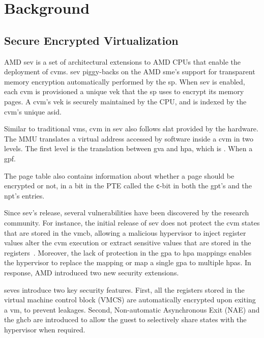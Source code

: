 \section{Background}
\subsection{Secure Encrypted Virtualization}

AMD \gls{sev} is a set of architectural extensions to AMD CPUs that enable the deployment of \glspl{cvm}.
\gls{sev} piggy-backs on the AMD \gls{sme}'s support for transparent memory encryption automatically performed by the \gls{sp}.
When \gls{sev} is enabled, each \gls{cvm} is provisioned a unique \gls{vek} that the \gls{sp} uses to encrypt its memory pages. A \gls{cvm}'s \gls{vek} is securely maintained by the CPU, and is indexed by the \gls{cvm}'s unique \gls{asid}.




Similar to traditional \glspl{vm}, \gls{cvm} in \gls{sev} also follows \gls{slat} provided by the hardware.
The MMU translates a virtual address accessed by software inside a \gls{cvm} in two levels. The first level is the translation between \gls{gva} and \gls{hpa}, which is . When a \gls{gpf}.

The page table also contains information about whether a page should be encrypted or not, in a bit in the PTE called the \texttt{c}-bit in both the \gls{gpt}'s and the \gls{npt}'s entries.



Since \gls{sev}'s release, several vulnerabilities have been discovered by the research community.
For instance, the initial release of \gls{sev} does not protect the \gls{cvm} states that are stored in the \gls{vmcb}, allowing a malicious hypervisor to inject register values alter the \gls{cvm} execution or extract sensitive values that are stored in the registers~\cite{morbitzer_extracting_2019}.
Moreover, the lack of protection in the \gls{gpa} to \gls{hpa} mappings enables the hypervisor to replace the mapping or map a single \gls{gpa} to multiple \glspl{hpa}.
In response, AMD introduced two new security extensions.

\Gls{seves} introduce two key security features. First, all the registers stored in the virtual machine control block (VMCS) are automatically encrypted upon exiting a \gls{vm}, to prevent leakages. Second, Non-automatic Asynchronous Exit (NAE) and the \gls{ghcb} are introduced to allow the guest to selectively share states with the hypervisor when required.

